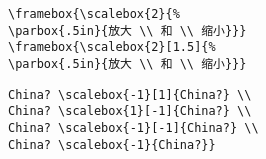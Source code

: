 \begin{center}
\begin{minipage}[b]{.5\textwidth}
	\par\vspace{0pt}
\end{minipage}%
\begin{minipage}[b]{.5\textwidth}
\begin{lstlisting}
\framebox{\scalebox{2}{%
\parbox{.5in}{放大 \\ 和 \\ 缩小}}}
\framebox{\scalebox{2}[1.5]{%
\parbox{.5in}{放大 \\ 和 \\ 缩小}}}
\end{lstlisting}
\par\vspace{0pt}
\end{minipage}	
\end{center}

\begin{center}
\begin{minipage}[b]{.5\textwidth}
	\begin{center}
	\end{center}
	\par\vspace{0pt}
\end{minipage}%
\begin{minipage}[b]{.5\textwidth}
\begin{lstlisting}
China? \scalebox{-1}[1]{China?} \\
China? \scalebox{1}[-1]{China?} \\
China? \scalebox{-1}[-1]{China?} \\
China? \scalebox{-1}{China?}}
\end{lstlisting}
\par\vspace{0pt}
\end{minipage}
\end{center}



